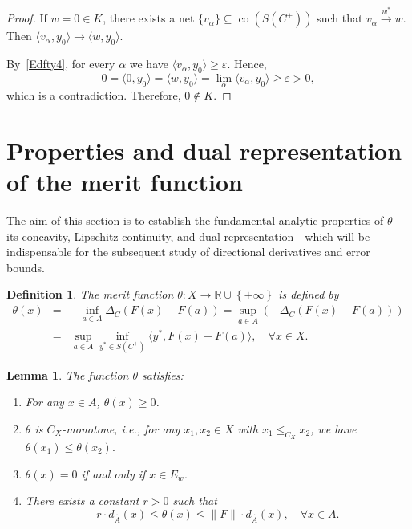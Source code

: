 \documentclass[10pt,a4paper]{amsart}
\newtheorem{definition}{Definition}[section]
\newtheorem{lemma}{Lemma}[section]
\begin{document}
\begin{proof}
If \(w = 0 \in K\), there exists a net \(\{v_\alpha\} \subseteq \operatorname{co}(S(C^+))\) such that \(v_\alpha \xrightarrow{w^*} w\). Then \(\langle v_\alpha, y_0 \rangle \to \langle w, y_0 \rangle\).

By~\eqref{Edfty4}, for every \(\alpha\) we have \(\langle v_\alpha, y_0 \rangle \ge \varepsilon\). Hence,
\[
0 = \langle 0, y_0 \rangle = \langle w, y_0 \rangle = \lim_\alpha \langle v_\alpha, y_0 \rangle \ge \varepsilon > 0,
\]
which is a contradiction. Therefore, \(0 \notin K\).
   \end{proof}  

\section{Properties and dual representation of the merit function  }\label{sec:merit}

 The aim of this section is to establish the fundamental analytic properties of 
 $\theta$—its concavity, Lipschitz continuity, and dual representation—which will be indispensable for the subsequent study of directional derivatives and error bounds.

\begin{definition}\label{def:theta}  \cite{LiuNgYang2009}
	The merit function $\theta : X \to \mathbb{R}\cup \left\{ +\infty \right\}$ is defined by
	 	\begin{eqnarray*}  	\theta(x) &=& -\inf_{a \in A} \Delta_C(F(x) - F(a)) = \sup_{a \in A} (-\Delta_C(F(x) - F(a))) \\
		&=&   \sup_{a \in A} \inf_{y^* \in S(C^+)} \langle y^*, F(x) - F(a) \rangle, \quad \forall x \in X.
	\end{eqnarray*}
	
	
	
\end{definition}

\begin{lemma} \label{YL:thetaprop} \cite[Theorem 3]{LiuNgYang2009}
	The function $\theta$ satisfies:
	\begin{enumerate}[leftmargin=*,label=(\roman*)]
		\item For any $x \in A$, $\theta(x) \geq 0$.
		\item $\theta$ is $C_X$-monotone, i.e.,  for any $x_1, x_2 \in X$ with $x_1 \le_{C_X} x_2$, we have 	$	  \theta(x_1)   \leq	\theta(x_2) .		$
		\item $\theta(x) = 0$ if and only if $x \in E_w$.
		\item There exists a constant $r > 0$   such that
		\[
		r \cdot d_{\widehat{A}}(x) \leq \theta(x) \leq \|F\| \cdot d_{\widehat{A}}(x), \quad \forall x \in A.
		\]
	\end{enumerate}
\end{lemma}
\end{document}
